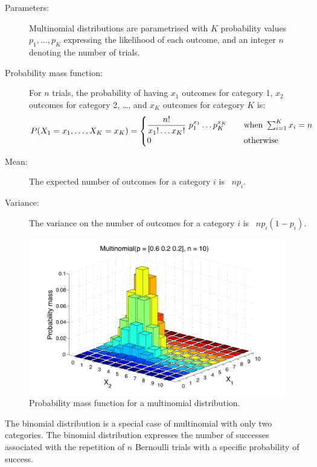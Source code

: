 \begin{description}
\item [Parameters: ] Multinomial distributions are parametrised with $K$ probability values $p_1, \dots, p_K$ expressing the likelihood of each outcome, and an integer $n$ denoting the number of trials.

\item [Probability mass function: ] For $n$ trials,  the probability of having $x_1$ outcomes for category 1, $x_2$ outcomes for category 2, \dots, and $x_K$ outcomes for category $K$ is:
\begin{align}
P(X_1 = x_1,\dots, X_K = x_K)  = \begin{cases} { \displaystyle {n! \over x_1!\dots x_K!}\ p_1^{x_1} \dots p_K^{x_K}} \quad &
\mbox{when } \sum_{i=1}^K x_i=n \\
0 & \mbox{otherwise} \end{cases}
\end{align} 
\item [Mean: ] The expected number of outcomes for a category $i$ is \ $ n p_i$.

\item [Variance: ] The variance on the number of outcomes for a category $i$ is \ $n  p_i (1-p_i)$.
\end{description}

\begin{figure}[h!]
\centering
\includegraphics[scale=0.40]{imgs/multinomial_appendix.pdf}
\caption{Probability mass function for a multinomial distribution.} 
\label{fig:multinomial-appendix}
\end{figure}

The binomial distribution is a special case of multinomial with only two categories.  The binomial distribution expresses the number of successes associated with the repetition of $n$ Bernoulli trials with a specific probability of success. 

